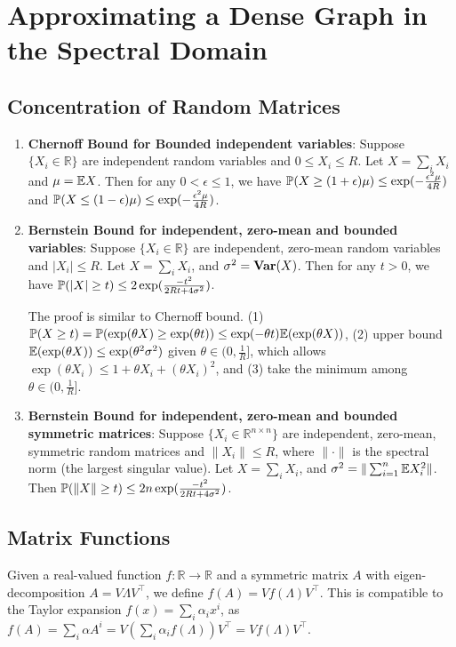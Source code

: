 \section{Approximating a Dense Graph in the Spectral Domain}

\subsection{Concentration of Random Matrices}

\begin{enumerate}
    \item \textbf{Chernoff Bound for Bounded independent variables}: Suppose $\{X_i \in \mathbb{R}\}$ are independent random variables and $0\le X_i \le R$. Let $X = \sum_i X_i$ and $\mu = \mathbb{E} X$. Then for any $0<\epsilon \le 1$, we have $\mathbb{P}(X \ge (1+\epsilon)\mu) \le \exp(-\frac{\epsilon^2 \mu}{4R})$ and $\mathbb{P}(X \le (1-\epsilon)\mu) \le \exp(-\frac{\epsilon^2 \mu}{4R})$.
    \item \textbf{Bernstein Bound for independent, zero-mean and bounded variables}: Suppose $\{X_i \in \mathbb{R}\}$ are independent, zero-mean random variables and $|X_i| \le R$. Let $X = \sum_i X_i$, and $\sigma^2 = \operatorname{\textbf{Var}}(X)$. Then for any $t > 0$, we have $\mathbb{P}(|X| \ge t) \le 2\exp(\frac{-t^2}{2Rt+4\sigma^2})$.

    The proof is similar to Chernoff bound. (1) $\mathbb{P}(X\ge t) = \mathbb{P}(\exp(\theta X) \ge \exp(\theta t)) \le \exp(-\theta t)\mathbb{E} (\exp(\theta X))$, (2) upper bound $\mathbb{E} (\exp(\theta X)) \le \exp(\theta^2 \sigma^2)$ given $\theta \in (0, \frac{1}{R}]$, which allows $\exp(\theta X_i) \le 1+\theta X_i +(\theta X_i)^2$, and (3) take the minimum among $\theta \in (0,\frac{1}{R}]$.

    \item \textbf{Bernstein Bound for independent, zero-mean and bounded symmetric matrices}: Suppose $\{X_i \in \mathbb{R}^{n\times n}\}$ are independent, zero-mean, symmetric random matrices and $\|X_i\| \le R$, where $\|\cdot\|$ is the spectral norm (the largest singular value). Let $X = \sum_i X_i$, and $\sigma^2 = \|\sum_{i=1}^n \mathbb{E} X_i^2\|$. Then $\mathbb{P}(\|X\|\ge t) \le 2n \exp(\frac{-t^2}{2Rt+4\sigma^2})$.
\end{enumerate}

\subsection{Matrix Functions}

Given a real-valued function $f: \mathbb{R}\rightarrow \mathbb{R}$ and a symmetric matrix $A$ with eigen-decomposition $A=V\Lambda V^\top$, we define $f(A) = V f(\Lambda) V^\top$. This is compatible to the Taylor expansion $f(x) = \sum_i \alpha_i x^i$, as $f(A) = \sum_i \alpha A^i = V (\sum_i \alpha_i f(\Lambda)) V^\top = V f(\Lambda) V^\top$.

